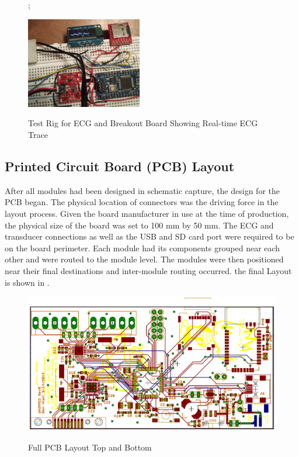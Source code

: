 \begin{figure};
	\begin{center}
		\label{fig:Breakout Test}
		\includegraphics[scale=1,width=0.45\textwidth]{Images/BreadBoardTest.png} 		
		\caption{Test Rig for ECG and  Breakout Board Showing Real-time ECG Trace}
	\end{center}
\end{figure}


\subsection{Printed Circuit Board (PCB) Layout}
After all modules had been designed in schematic capture, the design for the PCB began. The physical location of connectors was the driving force in the layout process. Given the board manufacturer in use at the time of production, the physical size of the board was set to 100 mm by 50 mm. The ECG and  transducer connections as well as the USB and SD card port were required to be on the board perimeter. Each module had its components grouped near each other and were routed to the module level. The modules were then positioned near their final destinations and inter-module routing occurred. the final Layout is shown in .

\begin{figure}[ht]
\begin{center}
	\label{fig:FullLayout}
	\includegraphics[angle=0,scale=1,width=1\textwidth]{Images/rev1D_PCB_cropped.pdf} 
	\caption{Full PCB Layout Top and Bottom}
\end{center}
\end{figure}


